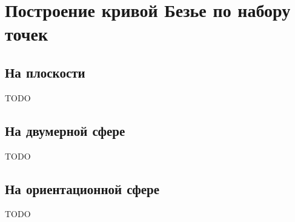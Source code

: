 \section{Построение кривой Безье по набору точек}

\subsection*{На плоскости}

TODO

\subsection*{На двумерной сфере}

TODO

\subsection*{На ориентационной сфере}

TODO
